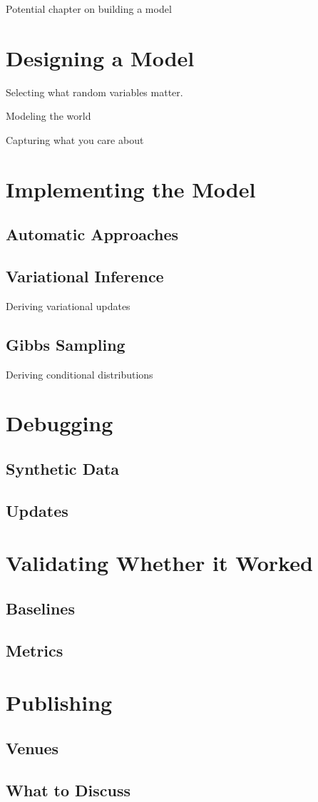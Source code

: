 
Potential chapter on building a model

\section{Designing a Model}

Selecting what random variables matter.

Modeling the world

Capturing what you care about

\section{Implementing the Model}

\subsection{Automatic Approaches}

\subsection{Variational Inference}

Deriving variational updates

\subsection{Gibbs Sampling}

Deriving conditional distributions

\section{Debugging}

\subsection{Synthetic Data}

\subsection{Updates}

\section{Validating Whether it Worked}

\subsection{Baselines}

\subsection{Metrics}

\section{Publishing}

\subsection{Venues}

\subsection{What to Discuss}
